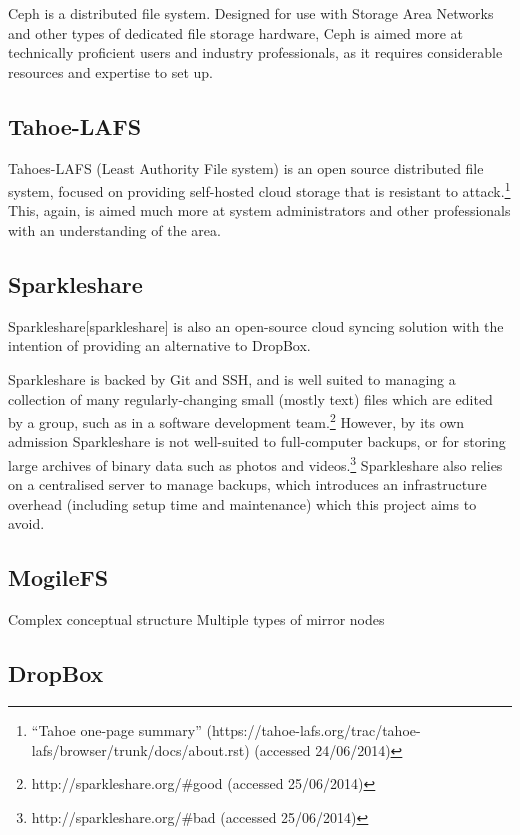 \documentclass[12pt,a4paper,]{adreport}
\begin{document}
Ceph is a distributed file system. Designed for use with Storage Area
Networks and other types of dedicated file storage hardware, Ceph is
aimed more at technically proficient users and industry professionals,
as it requires considerable resources and expertise to set up.

\subsection{Tahoe-LAFS}\label{tahoe-lafs}

Tahoes-LAFS (Least Authority File system) is an open source distributed
file system, focused on providing self-hosted cloud storage that is
resistant to attack.\footnote{``Tahoe one-page summary''
  (https://tahoe-lafs.org/trac/tahoe-lafs/browser/trunk/docs/about.rst)
  (accessed 24/06/2014)} This, again, is aimed much more at system
administrators and other professionals with an understanding of the
area.

\subsection{Sparkleshare}\label{sparkleshare}

Sparkleshare{[}sparkleshare{]} is also an open-source cloud syncing
solution with the intention of providing an alternative to DropBox.

Sparkleshare is backed by Git and SSH, and is well suited to managing a
collection of many regularly-changing small (mostly text) files which
are edited by a group, such as in a software development team.\footnote{http://sparkleshare.org/\#good
  (accessed 25/06/2014)} However, by its own admission Sparkleshare is
not well-suited to full-computer backups, or for storing large archives
of binary data such as photos and videos.\footnote{http://sparkleshare.org/\#bad
  (accessed 25/06/2014)} Sparkleshare also relies on a centralised
server to manage backups, which introduces an infrastructure overhead
(including setup time and maintenance) which this project aims to avoid.

\subsection{MogileFS}\label{mogilefs}

Complex conceptual structure Multiple types of mirror nodes

\subsection{DropBox}\label{dropbox}
\end{document}
